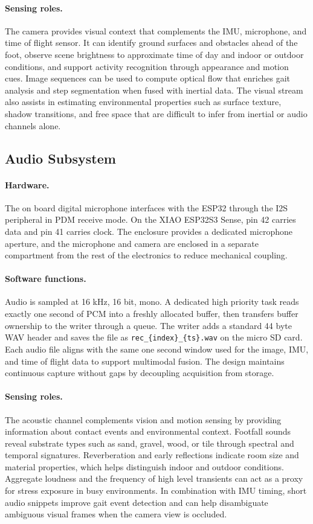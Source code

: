 \documentclass[manuscript,review,anonymous]{acmart}
\begin{document}
\paragraph{Sensing roles.}
The camera provides visual context that complements the IMU, microphone, and time of flight sensor. It can identify ground surfaces and obstacles ahead of the foot, observe scene brightness to approximate time of day and indoor or outdoor conditions, and support activity recognition through appearance and motion cues. Image sequences can be used to compute optical flow that enriches gait analysis and step segmentation when fused with inertial data. The visual stream also assists in estimating environmental properties such as surface texture, shadow transitions, and free space that are difficult to infer from inertial or audio channels alone.


\subsection{Audio Subsystem}
\paragraph{Hardware.}
The on board digital microphone interfaces with the ESP32 through the I2S peripheral in PDM receive mode. On the XIAO ESP32S3 Sense, pin 42 carries data and pin 41 carries clock. The enclosure provides a dedicated microphone aperture, and the microphone and camera are enclosed in a separate compartment from the rest of the electronics to reduce mechanical coupling.

\paragraph{Software functions.}
Audio is sampled at 16 kHz, 16 bit, mono. A dedicated high priority task reads exactly one second of PCM into a freshly allocated buffer, then transfers buffer ownership to the writer through a queue. The writer adds a standard 44 byte WAV header and saves the file as \texttt{rec\_\{index\}\_\{ts\}.wav} on the micro SD card. Each audio file aligns with the same one second window used for the image, IMU, and time of flight data to support multimodal fusion. The design maintains continuous capture without gaps by decoupling acquisition from storage.

\paragraph{Sensing roles.}
The acoustic channel complements vision and motion sensing by providing information about contact events and environmental context. Footfall sounds reveal substrate types such as sand, gravel, wood, or tile through spectral and temporal signatures. Reverberation and early reflections indicate room size and material properties, which helps distinguish indoor and outdoor conditions. Aggregate loudness and the frequency of high level transients can act as a proxy for stress exposure in busy environments. In combination with IMU timing, short audio snippets improve gait event detection and can help disambiguate ambiguous visual frames when the camera view is occluded.
\end{document}
